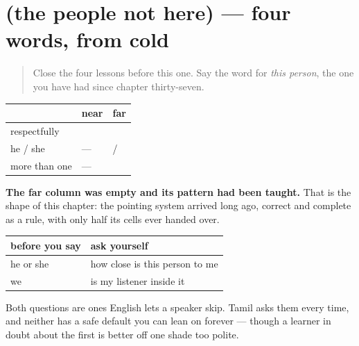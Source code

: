\section[(the people not here)]{(the people not here) — four words, from cold}

\label{lesson:TA-R85-avarkal-recall}



\begin{quote}
Close the four lessons before this one. Say the word for \emph{this person}, the one you have had since chapter thirty-seven.
\end{quote}

\begin{grammarlens}[title={Grammar Lens: the table, filled in}]
\noindent
\begin{tabularx}{\linewidth}{@{}>{\raggedright\arraybackslash}X>{\raggedright\arraybackslash}X>{\raggedright\arraybackslash}X@{}}
\toprule
\textbf{} & \textbf{near} & \textbf{far} \\
\midrule
respectfully & \ta{இவர்} & \ta{அவர்} \\
he / she & — & \ta{அவன்} / \ta{அவள்} \\
more than one & — & \ta{அவர்கள்} \\
\bottomrule
\end{tabularx}

\textbf{The far column was empty and its pattern had been taught.} That is the shape of this chapter: the pointing system arrived long ago, correct and complete as a rule, with only half its cells ever handed over.
\end{grammarlens}

\begin{grammarlens}[title={Grammar Lens: the question behind each choice}]
\noindent
\begin{tabularx}{\linewidth}{@{}>{\raggedright\arraybackslash}X>{\raggedright\arraybackslash}X@{}}
\toprule
\textbf{before you say} & \textbf{ask yourself} \\
\midrule
he or she & how close is this person to me \\
we & is my listener inside it \\
\bottomrule
\end{tabularx}

Both questions are ones English lets a speaker skip. Tamil asks them every time, and neither has a safe default you can lean on forever — though a learner in doubt about the first is better off one shade too polite.
\end{grammarlens}

